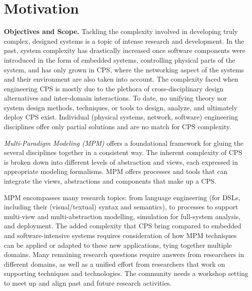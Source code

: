 \section{Motivation}
\label{sec:Motivation}


\noindent
\textbf{Objectives and Scope.}
%
Tackling the complexity involved in developing truly complex, designed systems 
is a topic of intense research and development.
In the past, system complexity has drastically increased once software components 
were introduced in the form of embedded systems, controlling physical parts of 
the system, and has only grown in CPS, where the networking aspect of the systems 
and their environment are also taken into account.
The complexity faced when engineering CPS is mostly due to the plethora of 
cross-disciplinary design alternatives and inter-domain interactions.
To date, no unifying theory nor system design methods, techniques, or tools to 
design, analyze, and ultimately deploy CPS exist.
Individual (physical systems, network, software) engineering disciplines offer 
only partial solutions and are no match for CPS complexity.



\emph{Multi-Paradigm Modeling (MPM)} offers a foundational framework for gluing the 
several disciplines together in a consistent way.
The inherent complexity of CPS is broken down into different levels of 
abstraction and views, each expressed in appropriate modeling formalisms.
MPM offers processes and tools that can integrate the views, abstractions and 
components that make up a CPS.

MPM encompasses many research topics: from language engineering (for DSLs, 
including their (visual/textual) syntax and semantics), to processes to support multi-view 
and multi-abstraction modelling, simulation for full-system analysis, and deployment.
The added complexity that CPS bring compared to embedded and software-intensive 
systems requires consideration of how MPM techniques can be applied or adapted 
to these new applications, tying together multiple domains.
Many remaining research questions require answers from researchers in different 
domains, as well as a unified effort from researchers that work on supporting 
techniques and technologies.
The community needs a workshop setting to meet up and align past and future 
research activities.


